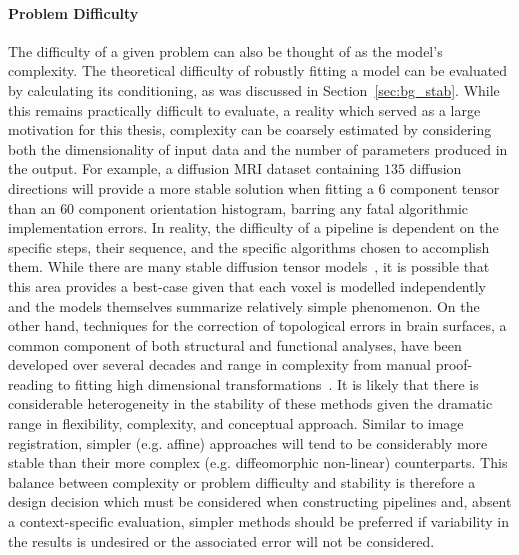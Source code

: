 \paragraph*{Problem Difficulty}
The difficulty of a given problem can also be thought of as the model's complexity. The theoretical difficulty of
robustly fitting a model can be evaluated by calculating its conditioning, as was discussed in
Section~\ref{sec:bg_stab}. While this remains practically difficult to evaluate, a reality which served as a large
motivation for this thesis, complexity can be coarsely estimated by considering both the dimensionality of input
data and the number of parameters produced in the output. For example, a diffusion MRI dataset containing $135$
diffusion directions will provide a more stable solution when fitting a $6$ component tensor than an $60$ component
orientation histogram, barring any fatal algorithmic implementation errors. In reality, the difficulty of a
pipeline is dependent on the specific steps, their sequence, and the specific algorithms chosen to accomplish them.
While there are many stable diffusion tensor models~\cite{skare2000condition}, it is possible that this area
provides a best-case given that each voxel is modelled independently and the models themselves summarize relatively
simple phenomenon. On the other hand, techniques for the correction of topological errors in brain surfaces, a
common component of both structural and functional analyses, have been developed over several decades and range in
complexity from manual proof-reading to fitting high dimensional transformations~\cite{yotter2011topological}. It
is likely that there is considerable heterogeneity in the stability of these methods given the dramatic range in
flexibility, complexity, and conceptual approach. Similar to image registration, simpler (e.g. affine) approaches
will tend to be considerably more stable than their more complex (e.g. diffeomorphic non-linear) counterparts.
This balance between complexity or problem difficulty and stability is therefore a design decision which must be
considered when constructing pipelines and, absent a context-specific evaluation, simpler methods should be
preferred if variability in the results is undesired or the associated error will not be considered.


